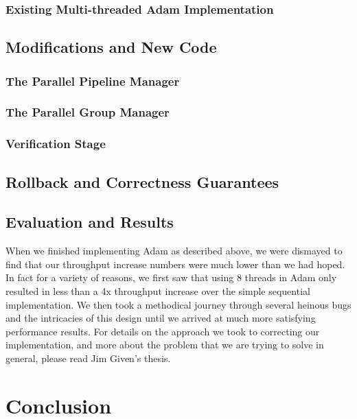 \documentclass[11pt, oneside]{report}
\begin{document}
\subsection{Existing Multi-threaded Adam Implementation}

\section{Modifications and New Code}

\subsection{The Parallel Pipeline Manager}

\subsection{The Parallel Group Manager}

\subsection{Verification Stage}

\section{Rollback and Correctness Guarantees}

\section{Evaluation and Results}

When we finished implementing Adam as described above, we were dismayed to find that our throughput increase numbers were much lower than we had hoped. In fact for a variety of reasons, we first saw that using 8 threads in Adam only resulted in less than a 4x throughput increase over the simple sequential implementation. We then took a methodical journey through several heinous bugs and the intricacies of this design until we arrived at much more satisfying performance results. For details on the approach we took to correcting our implementation, and more about the problem that we are trying to solve in general, please read Jim Given's thesis.

\chapter{Conclusion}
\end{document}
